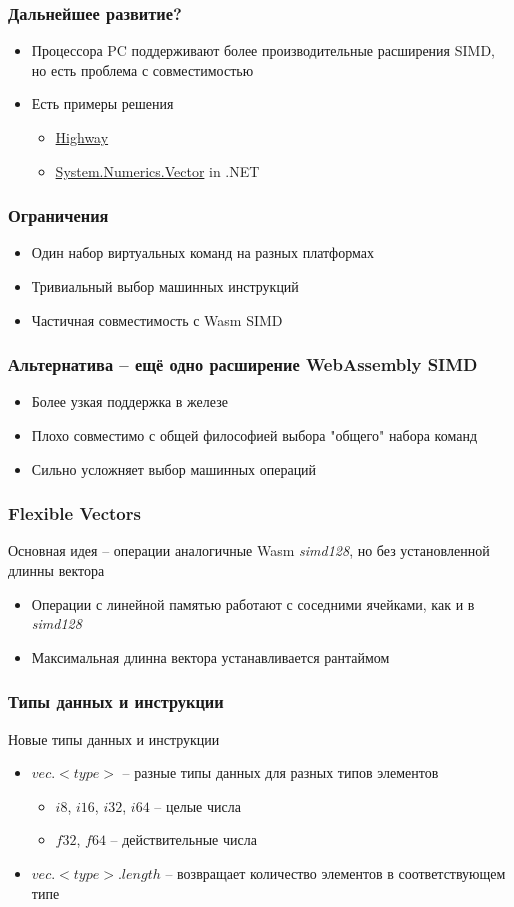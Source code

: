 \documentclass[t,aspectratio=169, xcolor={table}]{beamer}
\begin{document}
\begin{frame}
\frametitle{Дальнейшее развитие?}
  \begin{itemize}
  \item Процессора PC поддерживают более производительные расширения SIMD, но есть проблема с совместимостью \pause
  \item Есть примеры решения
    \begin{itemize}
    \item \href{https://github.com/google/highway}{Highway}
    \item \href{https://docs.microsoft.com/en-us/dotnet/api/system.numerics.vector}{System.Numerics.Vector} in .NET
    \end{itemize}
  \end{itemize}
\end{frame}
\begin{frame}
\frametitle{Ограничения}
  \begin{itemize}
  \item Один набор виртуальных команд на разных платформах
  \item Тривиальный выбор машинных инструкций
  \item Частичная совместимость с Wasm SIMD
  \end{itemize}
\end{frame}
\begin{frame}
\frametitle{Альтернатива -- ещё одно расширение WebAssembly SIMD}
  \begin{itemize}
  \item Более узкая поддержка в железе
  \item Плохо совместимо с общей философией выбора "общего" набора команд
  \item Сильно усложняет выбор машинных операций
  \end{itemize}
\end{frame}
\begin{frame}
\frametitle{Flexible Vectors}
  Основная идея -- операции аналогичные Wasm \textit{simd128}, но без установленной длинны вектора
  \begin{itemize}
  \item Операции с линейной памятью работают с соседними ячейками, как и в \textit{simd128}
  \item Максимальная длинна вектора устанавливается рантаймом
  \end{itemize}
\end{frame}
\begin{frame}
\frametitle{Типы данных и инструкции}
Новые типы данных и инструкции
  \begin{itemize}
  \item $vec.<type>$ -- разные типы данных для разных типов элементов
    \begin{itemize}
    \item $i8$, $i16$, $i32$, $i64$ -- целые числа
    \item $f32$, $f64$ -- действительные числа
    \end{itemize}
  \item $vec.<type>.length$ -- возвращает количество элементов в соответствующем типе
  \end{itemize}
\end{frame}
\end{document}
